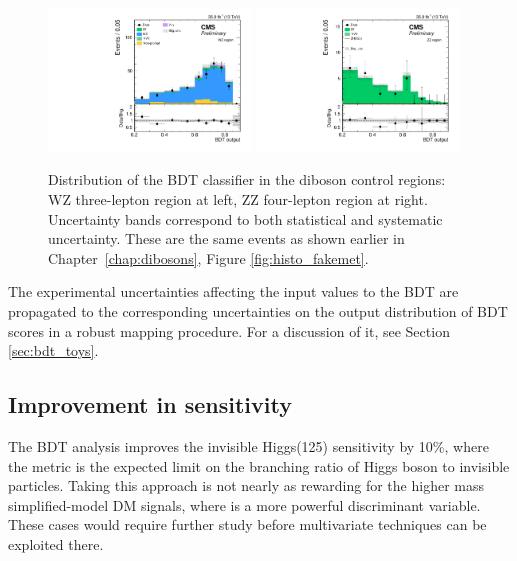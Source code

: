 \begin{figure}[htbp]
\begin{center}
\includegraphics[width=0.48\textwidth]{figures/fullsel_bdt_wz_postfit.pdf}
\includegraphics[width=0.48\textwidth]{figures/fullsel_bdt_zz_postfit.pdf}
\caption{Distribution of the BDT classifier in the diboson control regions: WZ three-lepton region at left, ZZ four-lepton region at right. Uncertainty bands correspond to both statistical and systematic uncertainty. These are the same events as shown earlier in Chapter~\ref{chap:dibosons}, Figure \ref{fig:histo_fakemet}.}
\label{fig:bdt_vv}
\end{center}
\end{figure}
\clearpage

The experimental uncertainties affecting the input values to the BDT are propagated to
the corresponding uncertainties on the output distribution of BDT scores in a robust mapping procedure.
For a discussion of it, see Section \ref{sec:bdt_toys}.

\subsection{Improvement in sensitivity} 
The BDT analysis improves the invisible Higgs(125) sensitivity by 10\%,
where the metric is the expected limit on the branching ratio of Higgs boson to invisible particles.
Taking this approach is not nearly as rewarding for the higher mass simplified-model DM signals, where \met is a more powerful discriminant variable.
These cases would require further study before multivariate techniques can be exploited there.

